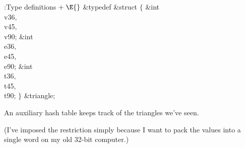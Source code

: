 \Y\B\4:Type definitions\X${}\mathrel+\E{}$\6
\&{typedef} \&{struct} ${}\{{}$\1\6
\&{int} \\{v36}${},{}$ \\{v45}${},{}$ \\{v90};\6
\&{int} \\{e36}${},{}$ \\{e45}${},{}$ \\{e90};\6
\&{int} \\{t36}${},{}$ \\{t45}${},{}$ \\{t90};\2\6
${}\}{}$ \&{triangle};\par
\fi

An auxiliary hash table keeps track of the triangles
we've seen.

(I've imposed the restriction  simply because I
want to
pack the values  into a single word on my
old 32-bit computer.)

